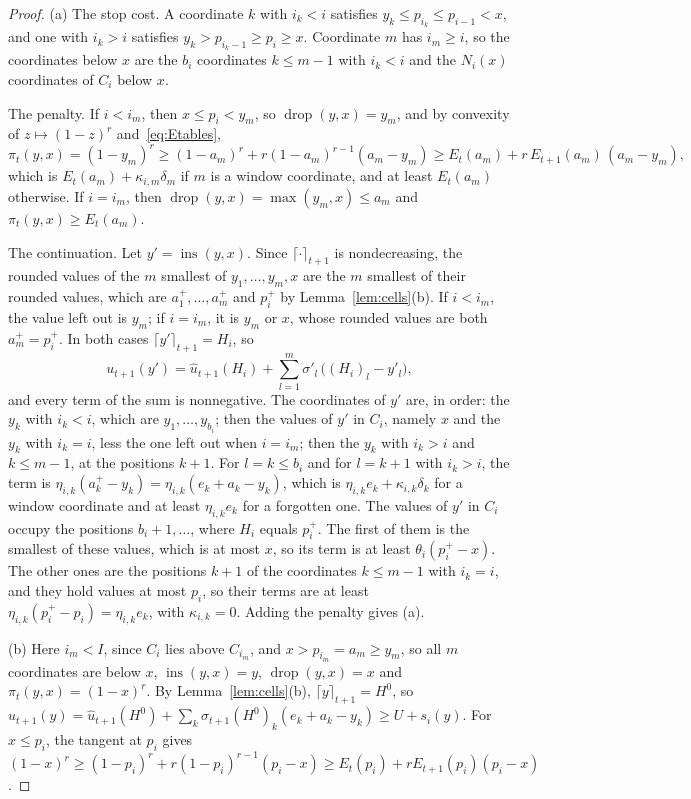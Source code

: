 \documentclass[11pt]{amsart}
\theoremstyle{definition}
\numberwithin{equation}{section}
\newcommand{\ins}{\operatorname{ins}}
\newcommand{\drop}{\operatorname{drop}}
\newcommand{\ceil}[2]{\lceil #1\rceil_{#2}}
\begin{document}
\begin{proof}
(a) The stop cost. A coordinate $k$ with $i_k<i$ satisfies $y_k\le p_{i_k}\le p_{i-1}<x$, and one with $i_k>i$ satisfies $y_k>p_{i_k-1}\ge p_i\ge x$. Coordinate $m$ has $i_m\ge i$, so the coordinates below $x$ are the $b_i$ coordinates $k\le m-1$ with $i_k<i$ and the $N_i(x)$ coordinates of $C_i$ below $x$.

The penalty. If $i<i_m$, then $x\le p_i<y_m$, so $\drop(y,x)=y_m$, and by convexity of $z\mapsto(1-z)^r$ and~\eqref{eq:Etables},
\[
\pi_t(y,x)=(1-y_m)^r\ge(1-a_m)^r+r(1-a_m)^{r-1}(a_m-y_m)\ge E_t(a_m)+r\,E_{t+1}(a_m)\,(a_m-y_m),
\]
which is $E_t(a_m)+\kappa_{i,m}\delta_m$ if $m$ is a window coordinate, and at least $E_t(a_m)$ otherwise. If $i=i_m$, then $\drop(y,x)=\max(y_m,x)\le a_m$ and $\pi_t(y,x)\ge E_t(a_m)$.

The continuation. Let $y'=\ins(y,x)$. Since $\ceil{\cdot}{t+1}$ is nondecreasing, the rounded values of the $m$ smallest of $y_1,\dots,y_m,x$ are the $m$ smallest of their rounded values, which are $a_1^+,\dots,a_m^+$ and $p_i^+$ by Lemma~\ref{lem:cells}(b). If $i<i_m$, the value left out is $y_m$; if $i=i_m$, it is $y_m$ or $x$, whose rounded values are both $a_m^+=p_i^+$. In both cases $\ceil{y'}{t+1}=H_i$, so
\[
u_{t+1}(y')=\hat u_{t+1}(H_i)+\sum_{l=1}^m\sigma'_l\,\bigl((H_i)_l-y'_l\bigr),
\]
and every term of the sum is nonnegative. The coordinates of $y'$ are, in order: the $y_k$ with $i_k<i$, which are $y_1,\dots,y_{b_i}$; then the values of $y'$ in $C_i$, namely $x$ and the $y_k$ with $i_k=i$, less the one left out when $i=i_m$; then the $y_k$ with $i_k>i$ and $k\le m-1$, at the positions $k+1$. For $l=k\le b_i$ and for $l=k+1$ with $i_k>i$, the term is $\eta_{i,k}(a_k^+-y_k)=\eta_{i,k}(e_k+a_k-y_k)$, which is $\eta_{i,k}e_k+\kappa_{i,k}\delta_k$ for a window coordinate and at least $\eta_{i,k}e_k$ for a forgotten one. The values of $y'$ in $C_i$ occupy the positions $b_i+1,\dots$, where $H_i$ equals $p_i^+$. The first of them is the smallest of these values, which is at most $x$, so its term is at least $\theta_i(p_i^+-x)$. The other ones are the positions $k+1$ of the coordinates $k\le m-1$ with $i_k=i$, and they hold values at most $p_i$, so their terms are at least $\eta_{i,k}(p_i^+-p_i)=\eta_{i,k}e_k$, with $\kappa_{i,k}=0$. Adding the penalty gives (a).

(b) Here $i_m<I$, since $C_i$ lies above $C_{i_m}$, and $x>p_{i_m}=a_m\ge y_m$, so all $m$ coordinates are below $x$, $\ins(y,x)=y$, $\drop(y,x)=x$ and $\pi_t(y,x)=(1-x)^r$. By Lemma~\ref{lem:cells}(b), $\ceil{y}{t+1}=H^0$, so $u_{t+1}(y)=\hat u_{t+1}(H^0)+\sum_k\sigma_{t+1}(H^0)_k(e_k+a_k-y_k)\ge U+s_i(y)$. For $x\le p_i$, the tangent at $p_i$ gives $(1-x)^r\ge(1-p_i)^r+r(1-p_i)^{r-1}(p_i-x)\ge E_t(p_i)+rE_{t+1}(p_i)(p_i-x)$.


\end{proof}
\end{document}
